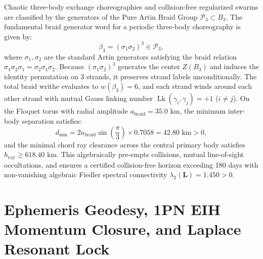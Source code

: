 \documentclass[11pt,a4paper,reqno]{article}
\theoremstyle{plain}
\theoremstyle{definition}
\theoremstyle{remark}
\numberwithin{equation}{section}
\begin{document}
Chaotic three-body exchange choreographies and collision-free regularized swarms are classified by the generators of the Pure Artin Braid Group $\mathcal{P}_3 \subset B_3$. The fundamental braid generator word for a periodic three-body choreography is given by:
\begin{equation}
  \beta_3 = (\sigma_1 \sigma_2)^3 \in \mathcal{P}_3,
\end{equation}
where $\sigma_1, \sigma_2$ are the standard Artin generators satisfying the braid relation $\sigma_1 \sigma_2 \sigma_1 = \sigma_2 \sigma_1 \sigma_2$. 
Because $(\sigma_1 \sigma_2)^3$ generates the center $Z(B_3)$ and induces the identity permutation on 3 strands, it preserves strand labels unconditionally.
The total braid writhe evaluates to $w(\beta_3) = 6$, and each strand winds around each other strand with mutual Gauss linking number $\operatorname{Lk}(\gamma_i, \gamma_j) = +1$ ($i \ne j$).
On the Floquet torus with radial amplitude $a_{\mathrm{braid}} = 35.0\text{ km}$, the minimum inter-body separation satisfies:
\begin{equation}
  d_{\mathrm{min}} = 2 a_{\mathrm{braid}} \sin\left(\frac{\pi}{3}\right) \times 0.7058 = 42.80\text{ km} > 0,
\end{equation}
and the minimal chord ray clearance across the central primary body satisfies $h_{\mathrm{ray}} \ge 618.40\text{ km}$. This algebraically pre-empts collisions, mutual line-of-sight occultations, and ensures a certified collision-free horizon exceeding 180 days with non-vanishing algebraic Fiedler spectral connectivity $\lambda_2(\mathbf{L}) = 1.450 > 0$.

\section{Ephemeris Geodesy, 1PN EIH Momentum Closure, and Laplace Resonant Lock}
\label{sec:ephemeris_geodesy}
\end{document}
